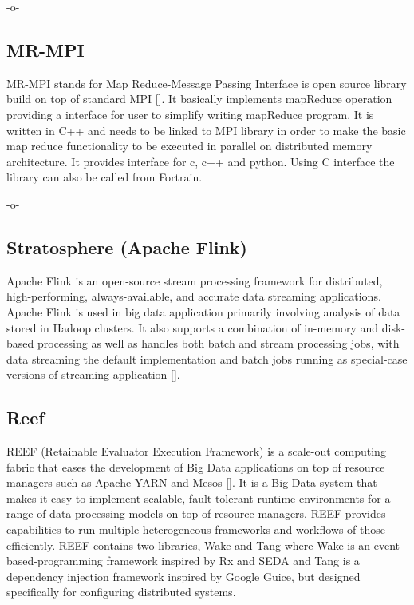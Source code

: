      -o-

\subsection{MR-MPI}

MR-MPI stands for Map Reduce-Message Passing Interface is open source
library build on top of standard MPI [\cite{www-mapreducempi}]. It
basically implements mapReduce operation providing a interface for
user to simplify writing mapReduce program.  It is written in C++ and
needs to be linked to MPI library in order to make the basic map
reduce functionality to be executed in parallel on distributed memory
architecture.  It provides interface for c, c++ and python. Using C
interface the library can also be called from Fortrain.

     -o-

\subsection{Stratosphere (Apache Flink)}
     
Apache Flink is an open-source stream processing framework for
distributed, high-performing, always-available, and accurate data
streaming applications. Apache Flink is used in big data application
primarily involving analysis of data stored in Hadoop clusters.  It
also supports a combination of in-memory and disk-based processing as
well as handles both batch and stream processing jobs, with data
streaming the default implementation and batch jobs running as
special-case versions of streaming application [\cite{www-flink}].


\subsection{Reef}

REEF (Retainable Evaluator Execution Framework) is a scale-out
computing fabric that eases the development of Big Data applications
on top of resource managers such as Apache YARN and
Mesos [\cite{www-reef}]. It is a Big Data system that makes it easy to
implement scalable, fault-tolerant runtime environments for a range of
data processing models on top of resource managers. REEF provides
capabilities to run multiple heterogeneous frameworks and workflows of
those efficiently. REEF contains two libraries, Wake and Tang where
Wake is an event-based-programming framework inspired by Rx and SEDA
and Tang is a dependency injection framework inspired by Google Guice,
but designed specifically for configuring distributed systems.


